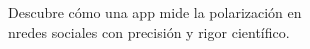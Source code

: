 \documentclass[preview]{standalone}
\begin{document}
\begin{center}
Descubre cómo una app mide la polarización en\\nredes sociales con precisión y rigor científico.
\end{center}
\end{document}
